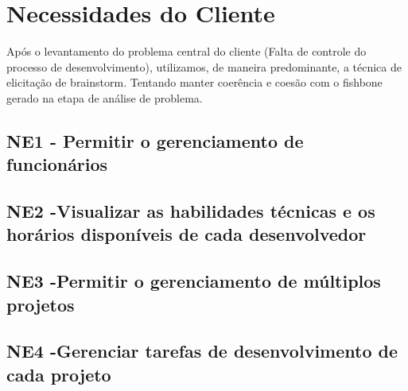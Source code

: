 \chapter{Necessidades do Cliente}

Após o levantamento do problema central do cliente (Falta de controle do processo de desenvolvimento), utilizamos, de maneira predominante, a técnica de elicitação de brainstorm. Tentando manter coerência e coesão com o fishbone gerado na etapa de análise de problema.

\section{NE1 - Permitir o gerenciamento de funcionários}

\section{NE2 -Visualizar as habilidades técnicas e os horários disponíveis de cada desenvolvedor}

\section{NE3 -Permitir o gerenciamento de múltiplos projetos}

\section{NE4 -Gerenciar tarefas de desenvolvimento de cada projeto}
